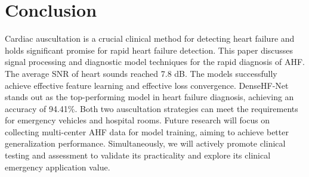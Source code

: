 \section{Conclusion}\label{Conclusion}
Cardiac auscultation is a crucial clinical method for detecting heart failure and holds significant promise for rapid heart failure detection. This paper discusses signal processing and diagnostic model techniques for the rapid diagnosis of AHF. The average SNR of heart sounds reached 7.8 dB. The models successfully achieve effective feature learning and effective loss convergence. DenseHF-Net stands out as the top-performing model in heart failure diagnosis, achieving an accuracy of 94.41\%. Both two auscultation strategies can meet the requirements for emergency vehicles and hospital rooms. Future research will focus on collecting multi-center AHF data for model training, aiming to achieve better generalization performance. Simultaneously, we will actively promote clinical testing and assessment to validate its practicality and explore its clinical emergency application value.